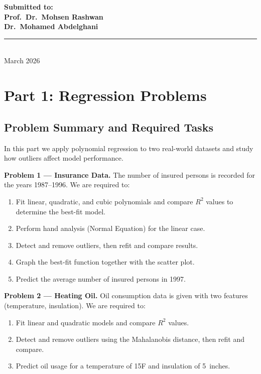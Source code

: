 \documentclass[12pt, a4paper]{article}
\providecommand{\MyPageBorder}{}
\providecommand{\AddToShipoutPictureFG}[1]{}
\begin{document}
\begin{titlepage}
\begin{center}
        \vspace{1cm}

        \textbf{Submitted to:} \\
        \textbf{Prof.\ Dr.\ Mohsen Rashwan} \\
        \textbf{Dr.\ Mohamed Abdelghani} \\
    \end{center}

    \vfill
    \rule{0.3\linewidth}{0.2mm} \\
    {\large March 2026}
\end{titlepage}

\AddToShipoutPictureFG{\MyPageBorder} 


\tableofcontents
\listoffigures
\newpage

\section{Part 1: Regression Problems}

\subsection{Problem Summary and Required Tasks}
In this part we apply polynomial regression to two real-world datasets and study how outliers affect model performance.

\textbf{Problem 1 --- Insurance Data.}  The number of insured persons is recorded for the years 1987--1996.  We are required to:
\begin{enumerate}
    \item Fit linear, quadratic, and cubic polynomials and compare $R^2$ values to determine the best-fit model.
    \item Perform hand analysis (Normal Equation) for the linear case.
    \item Detect and remove outliers, then refit and compare results.
    \item Graph the best-fit function together with the scatter plot.
    \item Predict the average number of insured persons in 1997.
\end{enumerate}

\textbf{Problem 2 --- Heating Oil.}  Oil consumption data is given with two features (temperature, insulation).  We are required to:
\begin{enumerate}
    \item Fit linear and quadratic models and compare $R^2$ values.
    \item Detect and remove outliers using the Mahalanobis distance, then refit and compare.
    \item Predict oil usage for a temperature of 15\textdegree F and insulation of 5~inches.
\end{enumerate}
\end{document}
